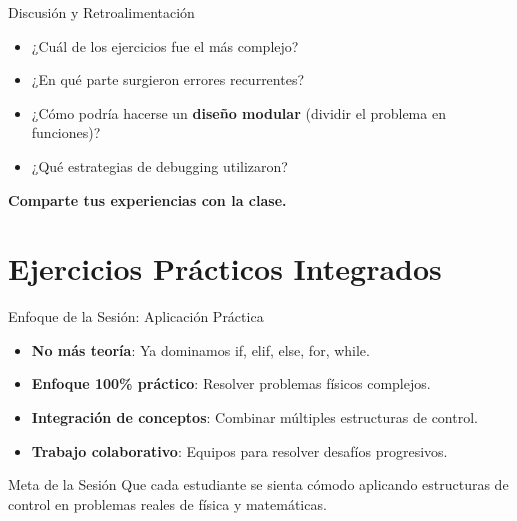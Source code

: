 \documentclass[10pt]{beamer}
\begin{document}
\begin{frame}{Discusión y Retroalimentación}
  \begin{itemize}
    \item ¿Cuál de los ejercicios fue el más complejo?
    \item ¿En qué parte surgieron errores recurrentes?
    \item ¿Cómo podría hacerse un \textbf{diseño modular} (dividir el problema en funciones)?
    \item ¿Qué estrategias de debugging utilizaron?
  \end{itemize}
  \vspace{0.2cm}
  \textbf{Comparte tus experiencias con la clase.}
\end{frame}


\section{Ejercicios Prácticos Integrados}

\begin{frame}{Enfoque de la Sesión: Aplicación Práctica}
  \begin{itemize}
    \item \textbf{No más teoría}: Ya dominamos if, elif, else, for, while.
    \item \textbf{Enfoque 100\% práctico}: Resolver problemas físicos complejos.
    \item \textbf{Integración de conceptos}: Combinar múltiples estructuras de control.
    \item \textbf{Trabajo colaborativo}: Equipos para resolver desafíos progresivos.
  \end{itemize}
  
  \begin{block}{Meta de la Sesión}
    Que cada estudiante se sienta cómodo aplicando estructuras de control en problemas reales de física y matemáticas.
  \end{block}
\end{frame}
\end{document}
